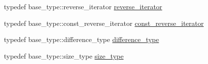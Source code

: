 \begin{DoxyCompactItemize}
\item 
typedef base\+\_\+type\+::reverse\+\_\+iterator \hyperlink{classIceBRG_1_1insertion__ordered__map_ae040bd2bd5e69ae6288849f97d666a24}{reverse\+\_\+iterator}
\item 
typedef base\+\_\+type\+::const\+\_\+reverse\+\_\+iterator \hyperlink{classIceBRG_1_1insertion__ordered__map_a6ea4c81c64ddc62cc283edcf681d892e}{const\+\_\+reverse\+\_\+iterator}
\item 
typedef base\+\_\+type\+::difference\+\_\+type \hyperlink{classIceBRG_1_1insertion__ordered__map_acf3d07daab9a17d295825ba88e86f9b6}{difference\+\_\+type}
\item 
typedef base\+\_\+type\+::size\+\_\+type \hyperlink{classIceBRG_1_1insertion__ordered__map_a1572dc5358a75c3908382208e74af12d}{size\+\_\+type}
\end{DoxyCompactItemize}
